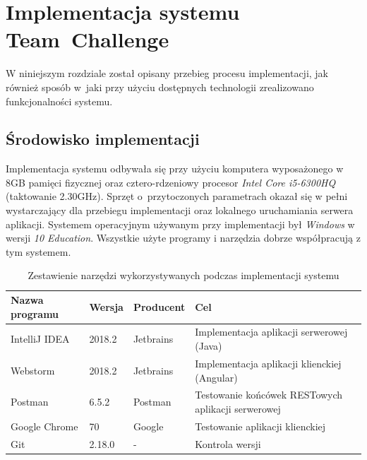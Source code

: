 \chapter{Implementacja systemu Team~Challenge}

W niniejszym rozdziale został opisany przebieg procesu implementacji, jak również sposób w~jaki przy użyciu dostępnych technologii zrealizowano funkcjonalności systemu. 

\section{Środowisko implementacji}

Implementacja systemu odbywała się przy użyciu komputera wyposażonego w 8GB pamięci fizycznej oraz cztero-rdzeniowy procesor \textit{Intel Core i5-6300HQ} (taktowanie 2.30GHz). Sprzęt o~przytoczonych parametrach okazał się w pełni wystarczający dla przebiegu implementacji oraz lokalnego uruchamiania serwera aplikacji. Systemem operacyjnym używanym przy implementacji był \textit{Windows} w wersji \textit{10 Education}. Wszystkie użyte programy i narzędzia dobrze współpracują z tym systemem.

\begin{table}[H]
\centering\small
\caption{Zestawienie narzędzi wykorzystywanych podczas implementacji systemu}
\label{tab:szablon}
\begin{tabularx}{\linewidth}{|p{.2\linewidth}|p{.1\linewidth}|p{.1\linewidth}|X|}\hline
Nazwa programu & Wersja & Producent & Cel\\ \hline\hline

IntelliJ IDEA & 2018.2 & Jetbrains & Implementacja aplikacji serwerowej (Java) \\ \hline

Webstorm & 2018.2 & Jetbrains & Implementacja aplikacji klienckiej (Angular) \\ \hline

Postman & 6.5.2 & Postman & Testowanie końcówek RESTowych aplikacji serwerowej \\ \hline

Google Chrome & 70 & Google & Testowanie aplikacji klienckiej \\ \hline

Git & 2.18.0 & - & Kontrola wersji \\ \hline

\end{tabularx}
\end{table}

